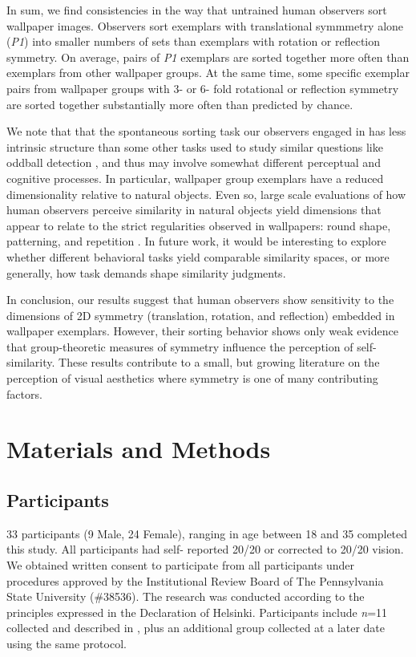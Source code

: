 \documentclass[11pt, twoside]{article}
\begin{document}
In sum, we find consistencies in the way that untrained human observers sort wallpaper images. Observers sort exemplars with translational symmmetry alone (\textit{P1}) into smaller numbers of sets than exemplars with rotation or reflection symmetry. On average, pairs of \textit{P1} exemplars are sorted together more often than exemplars from other wallpaper groups. At the same time, some specific exemplar pairs from wallpaper groups with 3- or 6- fold rotational or reflection symmetry are sorted together substantially more often than predicted by chance.

We note that that the spontaneous sorting task our observers engaged in has less intrinsic structure than some other tasks used to study similar questions like oddball detection \citep{RN1253,Hebart2020-so,Landwehr2011-kg}, and thus may involve somewhat different perceptual and cognitive processes. In particular, wallpaper group exemplars have a reduced dimensionality relative to natural objects. Even so, large scale evaluations of how human observers perceive similarity in natural objects yield dimensions that appear to relate to the strict regularities observed in wallpapers: round shape, patterning, and repetition \citep{Hebart2020-so}. In future work, it would be interesting to explore whether different behavioral tasks yield comparable similarity spaces, or more generally, how task demands shape similarity judgments.

In conclusion, our results suggest that human observers show sensitivity to the dimensions of 2D symmetry (translation, rotation, and reflection) embedded in wallpaper exemplars. However, their sorting behavior shows only weak evidence that group-theoretic measures of symmetry influence the perception of self-similarity. These results contribute to a small, but growing literature on the perception of visual aesthetics \citep{Carneiro2012-ph,Graham2010-yf,Friedenberg2012-gf,Laine-Hernandez2008-sg,Richards1972-gl} where symmetry is one of many contributing factors.

\section*{Materials and Methods}
\label{methods}

\subsection*{Participants}
33 participants (9 Male, 24 Female), ranging in age between 18 and 35 completed this study. All participants had self- reported 20/20 or corrected to 20/20 vision. We obtained written consent to participate from all participants under procedures approved by the Institutional Review Board of The Pennsylvania State University (\#38536). The research was conducted according to the principles expressed in the Declaration of Helsinki. Participants include \textit{n}=11 collected and described in \citep{vedak_thesis}, plus an additional group collected at a later date using the same protocol.
\end{document}
